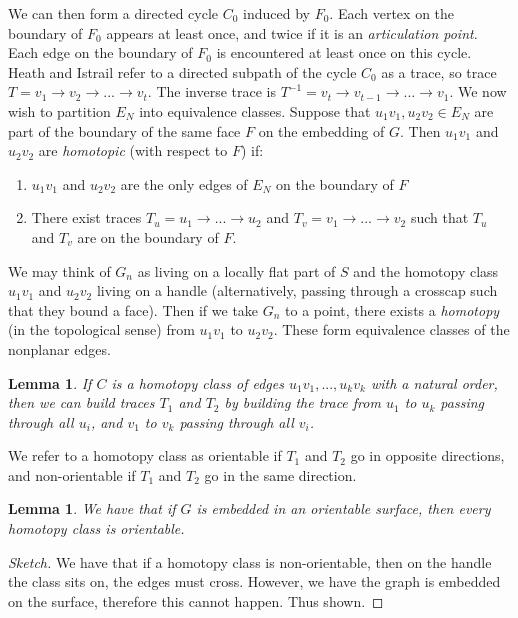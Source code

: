 \documentclass[]{report}
\newtheorem{lemma}[theorem]{Lemma}
\theoremstyle{definition}
\numberwithin{theorem}{section}
\numberwithin{equation}{section}
\begin{document}
We can then form a directed cycle $C_0$ induced by $F_0$. Each vertex on the boundary of $F_0$ appears at least once, and twice if it is an \textit{articulation point}. Each edge on the boundary of $F_0$ is encountered at least once on this cycle. Heath and Istrail refer to a directed subpath of the cycle $C_0$ as a trace, so trace $T = v_1 \rightarrow v_2 \rightarrow ... \rightarrow v_t$. The inverse trace is $T^{-1} = v_t \rightarrow v_{t-1} \rightarrow ... \rightarrow v_1$. We now wish to partition $E_N$ into equivalence classes. Suppose that $u_1v_1, u_2v_2 \in E_N$ are part of the boundary of the same face $F$ on the embedding of $G$. Then $u_1v_1$ and $u_2v_2$ are \textit{homotopic} (with respect to $F$) if:
\begin{enumerate}
	\item $u_1v_1$ and $u_2v_2$ are the only edges of $E_N$ on the boundary of $F$
	\item There exist traces $T_u = u_1 \rightarrow ... \rightarrow u_2$ and $T_v = v_1 \rightarrow ... \rightarrow v_2$ such that $T_u$ and $T_v$ are on the boundary of $F$.
\end{enumerate}
We may think of $G_n$ as living on a locally flat part of $S$ and the homotopy class $u_1v_1$ and $u_2 v_2$ living on a handle (alternatively, passing through a crosscap such that they bound a face). Then if we take $G_n$ to a point, there exists a \textit{homotopy} (in the topological sense) from $u_1v_1$ to $u_2v_2$. These form equivalence classes of the nonplanar edges.

\begin{lemma}
	If $C$ is a homotopy class of edges $u_1v_1, ..., u_kv_k$ with a natural order, then we can build traces $T_1$ and $T_2$ by building the trace from $u_1$ to $u_k$ passing through all $u_i$, and $v_1$ to $v_k$ passing through all $v_i$. 
\end{lemma}
We refer to a homotopy class as orientable if $T_1$ and $T_2$ go in opposite directions, and non-orientable if $T_1$ and $T_2$ go in the same direction.

\begin{lemma}
	We have that if $G$ is embedded in an orientable surface, then every homotopy class is orientable.
\end{lemma}
\begin{proof}[Sketch]
	We have that if a homotopy class is non-orientable, then on the handle the class sits on, the edges must cross. However, we have the graph is embedded on the surface, therefore this cannot happen. Thus shown. 
\end{proof}
\end{document}
